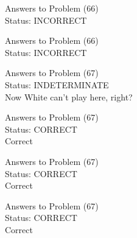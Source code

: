 \documentclass[11pt]{article}
\begin{document}
\begin{minipage}[t]{0.5\textwidth}
  {\centering
  
  Answers to Problem (66)\\
  Status: INCORRECT\\
  
  }
\end{minipage}
\begin{minipage}[t]{0.5\textwidth}
  {\centering
  
  Answers to Problem (66)\\
  Status: INCORRECT\\
  
  }
\end{minipage}
\begin{minipage}[t]{0.5\textwidth}
  {\centering
  
  Answers to Problem (67)\\
  Status: INDETERMINATE\\
  Now White can't play here, right?\\
  }
\end{minipage}
\begin{minipage}[t]{0.5\textwidth}
  {\centering
  
  Answers to Problem (67)\\
  Status: CORRECT\\
  Correct\\
  }
\end{minipage}
\begin{minipage}[t]{0.5\textwidth}
  {\centering
  
  Answers to Problem (67)\\
  Status: CORRECT\\
  Correct\\
  }
\end{minipage}
\begin{minipage}[t]{0.5\textwidth}
  {\centering
  
  Answers to Problem (67)\\
  Status: CORRECT\\
  Correct\\
  }
\end{minipage}
\end{document}
